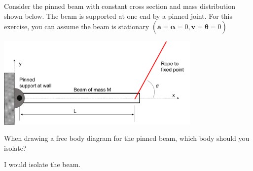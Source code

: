 Consider the pinned beam with constant cross section and mass distribution shown below. The beam is supported at one end by a pinned joint. For this exercise, you can assume the beam is stationary $(\boldsymbol{a}=\boldsymbol{\alpha}=0, \boldsymbol{v}=\boldsymbol{\dot{\theta}}=0)$

\begin{center}
    \includegraphics[width=0.75\textwidth]{img/fig24_1.png}
\end{center}

When drawing a free body diagram for the pinned beam, which body should you isolate?

\begin{solution}
    I would isolate the beam.
\end{solution}
